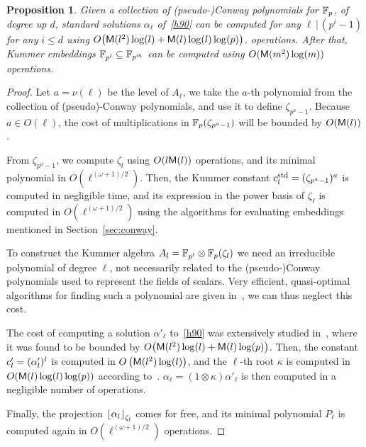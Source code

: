 \documentclass{sig-alternate}
\newtheorem{proposition}[theorem]{Proposition}
\begin{document}
\begin{proposition}
  Given a collection of (pseudo-)Conway polynomials for $\mathbb{F}_p$, of
  degree up $d$, standard solutions $\alpha_\ell$ of~\eqref{h90} can
  be computed for any $\ell\,|\,(p^i-1)$ for any $i\le d$ using
  $O\bigr(\mathsf{M}(l^2)\log(l) + \mathsf{M}(l)\log(l)\log(p)\bigl)$. %
  operations. %
  After that, Kummer embeddings $\mathbb{F}_{p^l}\subseteq\mathbb{F}_{p^m}$ can be
  computed using $O(\mathsf{M}(m^2)\log(m))$ operations.
\end{proposition}
\begin{proof}
  Let $a=\nu(\ell)$ be the level of $A_\ell$, we take the $a$-th
  polynomial from the collection of (pseudo)-Conway polynomials, and
  use it to define $\zeta_{p^a-1}$. %
  Because $a\in O(\ell)$, the cost of multiplications in
  $\mathbb{F}_p(\zeta_{p^a-1})$ will be bounded by $O(\mathsf{M}(l))$.

  From $\zeta_{p^a-1}$, we compute $\zeta_l$ using $O(l\mathsf{M}(l))$
  operations, and its minimal polynomial in
  $O(\ell^{(\omega+1)/2})$. %
  Then, the Kummer constant $c^{\mathrm{std}}_l=(\zeta_{p^a-1})^a$ is computed
  in negligible time, and its expression in the power basis of
  $\zeta_\ell$ is computed in $O(\ell^{(\omega+1)/2})$ using the
  algorithms for evaluating embeddings mentioned in
  Section~\ref{sec:conway}.

  To construct the Kummer algebra
  $A_l=\mathbb{F}_{p^l}\otimes\mathbb{F}_p(\zeta_l)$ we need an irreducible
  polynomial of degree $\ell$, not necessarily related to the
  (pseudo-)Conway polynomials used to represent the fields of
  scalars. %
  Very efficient, quasi-optimal algorithms for finding such a
  polynomial are given
  in~\cite{BoFlSaSc06,couveignes+lercier11,DeDoSc13}, we can thus
  neglect this cost.
  
  The cost of computing a solution $\alpha'_\ell$ to~\eqref{h90} was
  extensively studied in~\cite{brieulle2018computing}, where it was
  found to be bounded by
  $O\bigr(\mathsf{M}(l^2)\log(l) + \mathsf{M}(l)\log(p)\bigl)$. %
  Then, the constant $c'_l=(\alpha'_l)^l$ is computed in
  $O\left(\mathsf{M}(l^2)\log(l)\right)$, and the $\ell$-th root
  $\kappa$ is computed in $O(\mathsf{M}(l)\log(l)\log(p))$ according
  to~\cite{brieulle2018computing}. %
  $\alpha_\ell=(1\otimes\kappa)\alpha'_\ell$ is then computed in a
  negligible number of operations.

  Finally, the projection $\left\lfloor \alpha_l \right\rfloor_{\zeta_l}$ comes for
  free, and its minimal polynomial $P_\ell$ is computed again in
  $O(\ell^{(\omega+1)/2})$ operations.


\end{proof}
\end{document}
